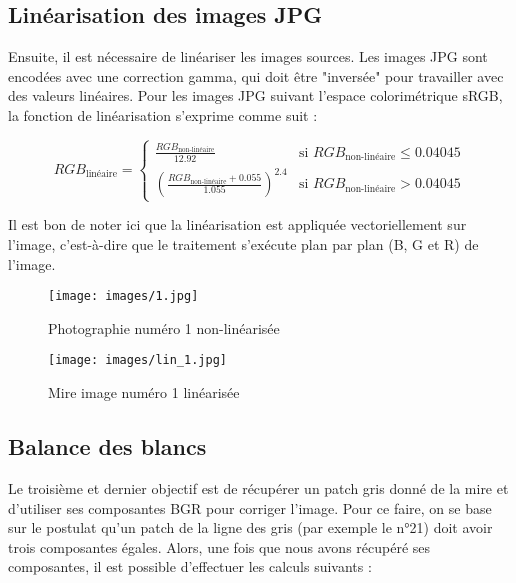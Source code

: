 \documentclass[12pt]{article}
\begin{document}
\subsection{Linéarisation des images JPG}

Ensuite, il est nécessaire de linéariser les images sources. Les images JPG sont encodées avec une correction gamma, qui doit être "inversée" pour travailler avec des valeurs linéaires. Pour les images JPG suivant l'espace colorimétrique sRGB, la fonction de linéarisation s'exprime comme suit :

\begin{equation}
RGB_{\text{linéaire}} = 
\begin{cases} 
\frac{RGB_{\text{non-linéaire}}}{12.92} & \text{si } RGB_{\text{non-linéaire}} \leq 0.04045 \\ 
\left(\frac{RGB_{\text{non-linéaire}} + 0.055}{1.055}\right)^{2.4} & \text{si } RGB_{\text{non-linéaire}} > 0.04045
\end{cases}
\end{equation}

Il est bon de noter ici que la linéarisation est appliquée vectoriellement sur l'image, c'est-à-dire que le traitement s'exécute plan par plan (B, G et R) de l'image.

\begin{figure}[H]
    \centering
    \begin{minipage}{0.48\textwidth}
        \centering
        \texttt{[image: images/1.jpg]}
        \caption{Photographie numéro 1 non-linéarisée}
    \end{minipage}
    \hfill
    \begin{minipage}{0.48\textwidth}
        \centering
        \texttt{[image: images/lin\_1.jpg]}
        \caption{Mire image numéro 1 linéarisée}
    \end{minipage}
\end{figure}

\subsection{Balance des blancs}
\label{sec:balance_des_blancs}

Le troisième et dernier objectif est de récupérer un patch gris donné de la mire et d'utiliser ses composantes BGR pour corriger l'image.
Pour ce faire, on se base sur le postulat qu'un patch de la ligne des gris (par exemple le n°21) doit avoir trois composantes égales.
Alors, une fois que nous avons récupéré ses composantes, il est possible d'effectuer les calculs suivants :
\end{document}
